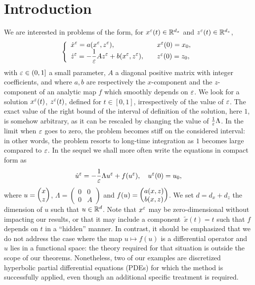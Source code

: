 

\section{Introduction}

We are interested in problems of the form, for $x^{\varepsilon}(t) \in \mathbb{R}^{d_x}$
and $z^{\varepsilon}(t) \in \mathbb{R}^{d_z}$, 
\begin{equation} \label{intro-eq:xz_pb}
\left\{
\begin{array}{ll} \displaystyle
\dot{x}^{\varepsilon} = a(x^{\varepsilon},z^{\varepsilon}), & x^{\varepsilon}(0) = x_0 , 
\\ \displaystyle
\dot{z}^{\varepsilon} = -\frac{1}{\varepsilon} A z^{\varepsilon} + b(x^{\varepsilon}, z^{\varepsilon}), \quad & z^{\varepsilon}(0) = z_0 , 
\end{array} \right.
\end{equation}
with $\varepsilon \in (0,1]$ a small parameter, $A$ a diagonal positive matrix
with integer coefficients, and where $a,b$ are respectively the
$x$-component and the $z$-component of an analytic map $f$ which smoothly
depends on $\varepsilon$. We look for a solution $x^{\varepsilon}(t)$, $z^{\varepsilon}(t)$,
defined for $t \in [0,1]$, irrespectively of the value of $\varepsilon$.  The
exact value of the right bound of the interval of definition of the
solution, here $1$, is somehow arbitrary, as it can be rescaled by
changing the value of $\frac{1}{\varepsilon}\Lambda$. In the limit when $\varepsilon$
goes to zero, the problem becomes stiff on the considered interval: in
other words, the problem resorts to long-time integration as $1$ becomes
large compared to $\varepsilon$. In the sequel we shall more often write the
equations in compact form as 
\begin{equation} \label{intro-pb:full_pb_on_u}
\dot{u}^{\varepsilon} = -\frac{1}{\varepsilon} \Lambda u^{\varepsilon} + f(u^{\varepsilon}), \quad u^{\varepsilon}(0) = u_0,
\end{equation}
where $u = \begin{pmatrix} x \\ z \end{pmatrix}$, $\Lambda = \begin{pmatrix} 0 & 0 \\ 0 & A
\end{pmatrix}$ and $f(u) = \begin{pmatrix} a(x,z) \\ b(x,z) \end{pmatrix}$. We set $d = d_x + d_z$
the dimension of $u$ such that $u \in \mathbb{R}^d$. Note that $x^{\varepsilon}$ may be
zero-dimensional without impacting our results, or that it may include a
component~$\tilde{x}(t) = t$ such that $f$ depends on $t$ in a ``hidden''
manner.
%
In contrast, it should be emphasized that we do not address the case where
the map $u \mapsto f(u)$ is a differential operator and $u$ lies in a
functional space: the theory required for that situation is outside the
scope of our theorems. Nonetheless, two of our examples are discretized
hyperbolic partial differential equations (PDEs) for which the method is
successfully applied, even though an additional  specific treatment is
required. 

